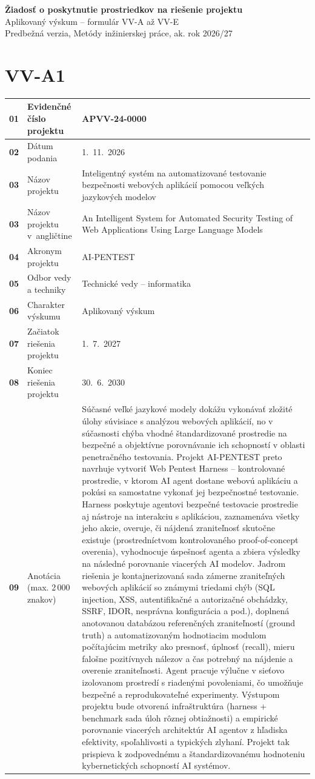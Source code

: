\documentclass[10pt,a4paper]{article}
\newcommand{\akronym}{AI-PENTEST}
\newcommand{\polozka}[3]{\textbf{#1} & \cellcolor{formbg}\small #2 & #3 \\ \hline}
\newenvironment{formular}[2]{%
  \section*{#1 \quad {\normalsize #2}}
  \noindent\renewcommand{\arraystretch}{1.35}%
  \begin{longtable}{|p{0.6cm}|p{4.6cm}|p{10.3cm}|}\hline
}{%
  \end{longtable}
}
\begin{document}
\begin{center}
  {\Large\bfseries Žiadosť o poskytnutie prostriedkov na riešenie projektu}\\[2pt]
  {\large Aplikovaný výskum -- formulár VV-A až VV-E}\\[4pt]
  {\small Predbežná verzia, Metódy inžinierskej práce, ak. rok 2026/27}
\end{center}

\begin{formular}{VV-A1}{Základné informácie o projekte}
\polozka{01}{Evidenčné číslo projektu}{APVV-24-0000}
\polozka{02}{Dátum podania}{1.~11.~2026}
\polozka{03}{Názov projektu}{Inteligentný systém na automatizované testovanie bezpečnosti webových aplikácií pomocou veľkých jazykových modelov}
\polozka{03}{Názov projektu v~angličtine}{An Intelligent System for Automated Security Testing of Web Applications Using Large Language Models}
\polozka{04}{Akronym projektu}{\akronym}
\polozka{05}{Odbor vedy a techniky}{Technické vedy -- informatika}
\polozka{06}{Charakter výskumu}{Aplikovaný výskum}
\polozka{07}{Začiatok riešenia projektu}{1.~7.~2027}
\polozka{08}{Koniec riešenia projektu}{30.~6.~2030}
\polozka{09}{Anotácia (max. 2\,000 znakov)}{%
Súčasné veľké jazykové modely dokážu vykonávať zložité úlohy súvisiace s analýzou webových aplikácií, no v súčasnosti chýba vhodné štandardizované prostredie na bezpečné a objektívne porovnávanie ich schopností v oblasti penetračného testovania. Projekt \akronym{} preto navrhuje vytvoriť Web Pentest Harness -- kontrolované prostredie, v ktorom AI agent dostane webovú aplikáciu a pokúsi sa samostatne vykonať jej bezpečnostné testovanie. Harness poskytuje agentovi bezpečné testovacie prostredie aj nástroje na interakciu s aplikáciou, zaznamenáva všetky jeho akcie, overuje, či nájdená zraniteľnosť skutočne existuje (prostredníctvom kontrolovaného proof-of-concept overenia), vyhodnocuje úspešnosť agenta a zbiera výsledky na následné porovnanie viacerých AI modelov. Jadrom riešenia je kontajnerizovaná sada zámerne zraniteľných webových aplikácií so známymi triedami chýb (SQL injection, XSS, autentifikačné a autorizačné obchádzky, SSRF, IDOR, nesprávna konfigurácia a pod.), doplnená anotovanou databázou referenčných zraniteľností (ground truth) a automatizovaným hodnotiacim modulom počítajúcim metriky ako presnosť, úplnosť (recall), mieru falošne pozitívnych nálezov a čas potrebný na nájdenie a overenie zraniteľnosti. Agent pracuje výlučne v sieťovo izolovanom prostredí s riadenými povoleniami, čo umožňuje bezpečné a reprodukovateľné experimenty. Výstupom projektu bude otvorená infraštruktúra (harness + benchmark sada úloh rôznej obtiažnosti) a empirické porovnanie viacerých architektúr AI agentov z hľadiska efektivity, spoľahlivosti a typických zlyhaní. Projekt tak prispieva k zodpovednému a štandardizovanému hodnoteniu kybernetických schopností AI systémov.}

\end{formular}
\end{document}
